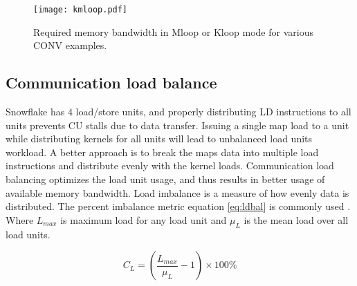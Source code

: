 \documentclass{sig-alternate}
\begin{document}

\begin{figure}[!t]
\centering
\texttt{[image: kmloop.pdf]}
\caption{Required memory bandwidth in Mloop or Kloop mode for various CONV examples.}
\label{fig:mkloop}
\end{figure}

\subsection{Communication load balance}
Snowflake has $4$ load/store units, and properly distributing LD instructions to all units prevents CU stalls due to data transfer. Issuing a single map load to a unit while distributing kernels for all units will lead to unbalanced load units workload. A better approach is to break the maps data into multiple load instructions and distribute evenly with the kernel loads. Communication load balancing optimizes the load unit usage, and thus results in better usage of available memory bandwidth. Load imbalance is a measure of how evenly data is distributed. The percent imbalance metric equation \ref{eq:ldbal} is commonly used \cite{loadimbalance}. Where $L_{max}$ is maximum load for any load unit and $\mu_{L}$ is the mean load over all load units. 

\begin{equation} \label{eq:ldbal}
C_{L} = (\frac{L_{max}}{\mu_{L}}-1)\times100\%
\end{equation}
\end{document}
